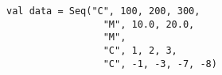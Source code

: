 \begin{lstlisting}[style=scalaioScala]
val data = Seq("C", 100, 200, 300,
                 "M", 10.0, 20.0,
                 "M",
                 "C", 1, 2, 3,
                 "C", -1, -3, -7, -8)
\end{lstlisting}
